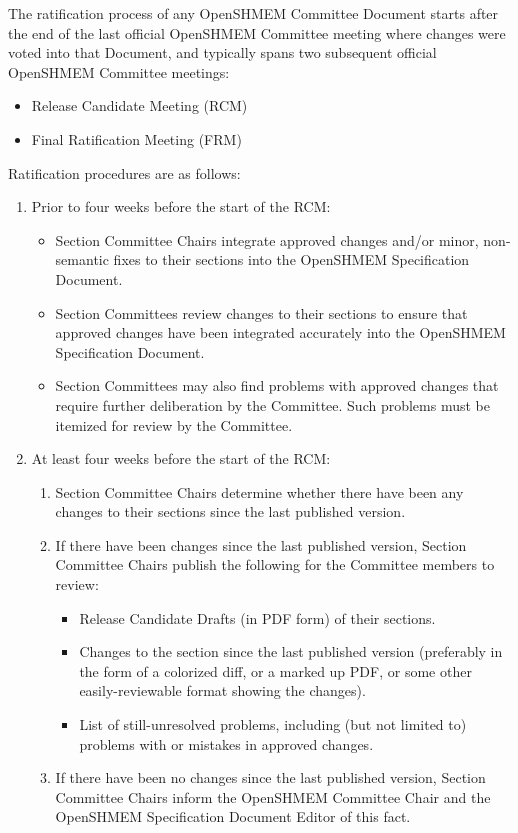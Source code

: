 The ratification process of any OpenSHMEM Committee Document starts after the
end of the last official OpenSHMEM Committee meeting where changes were voted
into that Document, and typically spans two subsequent official OpenSHMEM
Committee meetings:

\begin{itemize}
\item Release Candidate Meeting (RCM)
\item Final Ratification Meeting (FRM)
\end{itemize}

Ratification procedures are as follows:

\begin{enumerate}
\item Prior to four weeks before the start of the RCM:
  \begin{itemize}
  \item Section Committee Chairs integrate approved changes and/or
    minor, non-semantic fixes to their sections into the OpenSHMEM Specification
    Document.
  \item Section Committees review changes to their sections to ensure
    that approved changes have been integrated accurately into the OpenSHMEM
    Specification Document.
  \item Section Committees may also find problems with approved
    changes that require further deliberation by the Committee.  Such
    problems must be itemized for review by the Committee.
  \end{itemize}

\item At least four weeks before the start of the RCM:
  \begin{enumerate}
  \item Section Committee Chairs determine whether there have been
    any changes to their sections since the last published version.
  \item If there have been changes since the last published version,
    Section Committee Chairs publish the following for the Committee
    members to review:
    \begin{itemize}
      \item Release Candidate Drafts (in PDF form) of their sections.
      \item Changes to the section since the last published version
        (preferably in the form of a colorized diff, or a marked up
        PDF, or some other easily-reviewable format showing the
        changes).
      \item List of still-unresolved problems, including (but not
        limited to) problems with or mistakes in approved changes.
    \end{itemize}
  \item If there have been no changes since the last
    published version, Section Committee Chairs inform the OpenSHMEM Committee
    Chair and the OpenSHMEM Specification Document Editor of this fact.
  \end{enumerate}


\end{enumerate}

